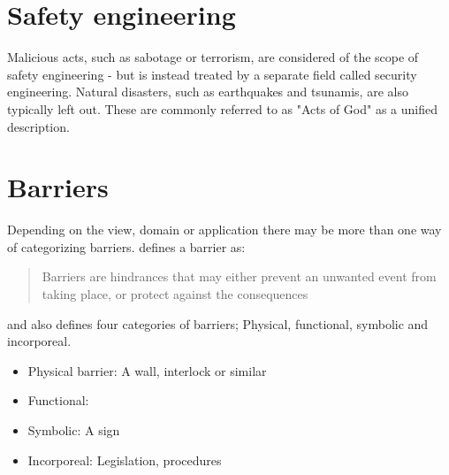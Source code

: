 \section{Safety engineering}
Malicious acts, such as sabotage or terrorism, are considered of the scope of safety engineering - but is instead treated by a separate field called security engineering. Natural disasters, such as earthquakes and tsunamis, are also typically left out. These are commonly referred to as "Acts of God" as a unified description.

\section{Barriers}
\label{sec:barriers}
Depending on the view, domain or application there may be more than one way of categorizing barriers.\cite{hollnagel2004barriers} defines a barrier as:
\begin{quote}
Barriers are hindrances that may either prevent an unwanted event from taking place, or protect against the consequences
\end{quote}
and also defines four categories of barriers; Physical, functional, symbolic and incorporeal.

\begin{itemize}
  \item Physical barrier: A wall, interlock or similar
  \item Functional: 
  \item Symbolic: A sign
  \item Incorporeal: Legislation, procedures
\end{itemize}


